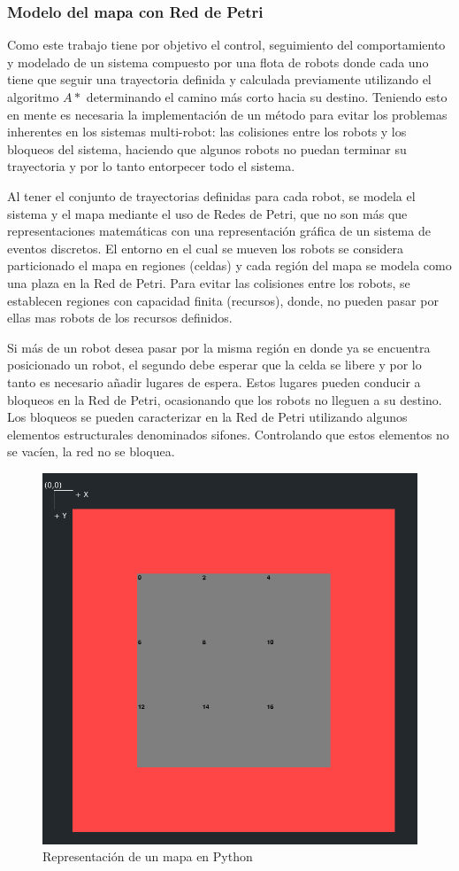 \subsubsection{Modelo del mapa con Red de Petri}

Como este trabajo tiene por objetivo el control, seguimiento del comportamiento y modelado de un sistema compuesto por una flota de robots donde cada uno tiene que seguir una trayectoria definida y calculada previamente utilizando el algoritmo $A*$ determinando el camino más corto hacia su destino. Teniendo esto en mente es necesaria la implementación de un método para evitar los problemas inherentes en los sistemas multi-robot: las colisiones entre los robots y los bloqueos del sistema, haciendo que algunos robots no puedan terminar su trayectoria y por lo tanto entorpecer todo el sistema.

Al tener el conjunto de trayectorias definidas para cada robot, se modela el sistema y el mapa mediante el uso de Redes de Petri, que no son más que representaciones matemáticas con una representación gráfica de un sistema de eventos discretos. El entorno en el cual se mueven los robots se considera particionado el mapa en regiones (celdas) y cada región del mapa se modela como una plaza en la Red de Petri. Para evitar las colisiones entre los robots, se establecen regiones con capacidad finita (recursos), donde, no pueden pasar por ellas mas robots de los recursos definidos. \cite{mahulea2020multi}

Si más de un robot desea pasar por la misma región en donde ya se encuentra posicionado un robot, el segundo debe esperar que la celda se libere y por lo tanto es necesario añadir lugares de espera. Estos lugares pueden conducir a bloqueos en la Red de Petri, ocasionando que los robots no lleguen a su destino. Los bloqueos se pueden caracterizar en la Red de Petri utilizando algunos elementos estructurales denominados sifones. Controlando que estos elementos no se vacíen, la red no se bloquea.

\begin{figure}[H]
   \centering
   \includegraphics[trim={1.35cm 0 0.9cm 1.5cm}, clip, width=0.6\linewidth]{images/mapa_py.png}
   \caption{Representación de un mapa en Python}
   \label{fig:mapa_py}
\end{figure}

